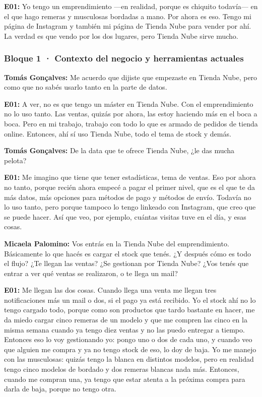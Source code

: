 \noindent\textbf{E01:} Yo tengo un emprendimiento ---en realidad, porque es chiquito todavía--- en el que hago remeras y musculosas bordadas a mano. Por ahora es eso. Tengo mi página de Instagram y también mi página de Tienda Nube para vender por ahí. La verdad es que vendo por los dos lugares, pero Tienda Nube sirve mucho.

\subsubsection*{Bloque 1 · Contexto del negocio y herramientas actuales}

\noindent\textbf{Tomás Gonçalves:} Me acuerdo que dijiste que empezaste en Tienda Nube, pero como que no sabés usarlo tanto en la parte de datos.

\noindent\textbf{E01:} A ver, no es que tengo un máster en Tienda Nube. Con el emprendimiento no lo uso tanto. Las ventas, quizás por ahora, las estoy haciendo más en el boca a boca. Pero en mi trabajo, trabajo con todo lo que es armado de pedidos de tienda online. Entonces, ahí sí uso Tienda Nube, todo el tema de stock y demás.

\noindent\textbf{Tomás Gonçalves:} De la data que te ofrece Tienda Nube, ¿le das mucha pelota?

\noindent\textbf{E01:} Me imagino que tiene que tener estadísticas, tema de ventas. Eso por ahora no tanto, porque recién ahora empecé a pagar el primer nivel, que es el que te da más datos, más opciones para métodos de pago y métodos de envío. Todavía no lo uso tanto, pero porque tampoco lo tengo linkeado con Instagram, que creo que se puede hacer. Así que veo, por ejemplo, cuántas visitas tuve en el día, y esas cosas.

\noindent\textbf{Micaela Palomino:} Vos entrás en la Tienda Nube del emprendimiento. Básicamente lo que hacés es cargar el stock que tenés. ¿Y después cómo es todo el flujo? ¿Te llegan las ventas? ¿Se gestionan por Tienda Nube? ¿Vos tenés que entrar a ver qué ventas se realizaron, o te llega un mail?

\noindent\textbf{E01:} Me llegan las dos cosas. Cuando llega una venta me llegan tres notificaciones más un mail o dos, si el pago ya está recibido. Yo el stock ahí no lo tengo cargado todo, porque como son productos que tardo bastante en hacer, me da miedo cargar cinco remeras de un modelo y que me compren las cinco en la misma semana cuando ya tengo diez ventas y no las puedo entregar a tiempo. Entonces eso lo voy gestionando yo: pongo uno o dos de cada uno, y cuando veo que alguien me compra y ya no tengo stock de eso, lo doy de baja. Yo me manejo con las musculosas: quizás tengo la blanca en distintos modelos, pero en realidad tengo cinco modelos de bordado y dos remeras blancas nada más. Entonces, cuando me compran una, ya tengo que estar atenta a la próxima compra para darla de baja, porque no tengo otra.

